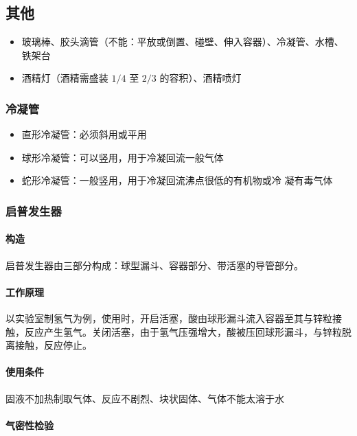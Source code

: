 \documentclass[10pt]{article}
\begin{document}
	\subsection{其他}
	\begin{itemize}
		\item 玻璃棒、胶头滴管（不能：平放或倒置、碰壁、伸入容器）、冷凝管、水槽、铁架台
		\item 酒精灯（酒精需盛装 $1/4$ 至 $2/3$ 的容积）、酒精喷灯
	\end{itemize}
	
	\subsubsection{冷凝管}
	\begin{itemize}
		\item 直形冷凝管：必须斜用或平用
		\item 球形冷凝管：可以竖用，用于冷凝回流一般气体
		\item 蛇形冷凝管：一般竖用，用于冷凝回流沸点很低的有机物或冷 凝有毒气体
	\end{itemize}
	
	\subsubsection{启普发生器}
	
	\paragraph{构造}
	
	启普发生器由三部分构成：球型漏斗、容器部分、带活塞的导管部分。
	
	\paragraph{工作原理}
	
	以实验室制氢气为例，使用时，开启活塞，酸由球形漏斗流入容器至其与锌粒接触，反应产生氢气。关闭活塞，由于氢气压强增大，酸被压回球形漏斗，与锌粒脱离接触，反应停止。
	
	\paragraph{使用条件}
	
	固液不加热制取气体、反应不剧烈、块状固体、气体不能太溶于水

	\paragraph{气密性检验}
	
\end{document}
